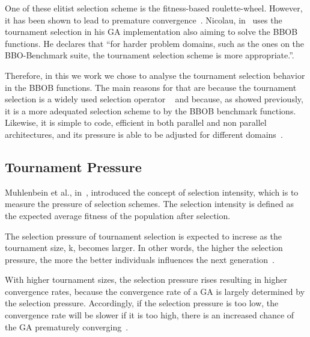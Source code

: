 One of these elitist selection scheme is the fitness-based roulette-wheel. However, it has been shown to lead to premature convergence~\cite{baker1987reducing}. Nicolau, in~\cite{nicolau2009application} uses the tournament selection in his GA implementation also aiming to solve the BBOB functions. He declares that ``for harder problem domains, such as the ones on the BBO-Benchmark suite, the tournament selection scheme is more appropriate.''.

Therefore, in this we work we chose to analyse the tournament selection behavior in the BBOB functions. The main reasons for that are because the tournament selection is a widely used selection operator ~\cite{goldberg1991real, goldberg1993toward, agrawal1995simulated, harik1999gambler, tsutsui1999multi, harik1999compact, deb2000efficient, beyer2001self,kaelo2007integrated, bhunia2009application,  nicolau2009application, sawyerr2011comparative, ecta14, sawyerr2015benchmarking} and because, as showed previously, it is a more adequated selection scheme to by the BBOB benchmark functions. Likewise, it is simple to code, efficient in both parallel and non parallel architectures, and its pressure is able to be adjusted for different domains~\cite{miller1995genetic}.



\subsection{Tournament Pressure}\label{sec:background:tournament_pressure} 
Muhlenbein et al., in~\cite{muhlenbein1993predictive}, introduced the concept of selection intensity, which is to measure the pressure of selection schemes. The selection intensity is defined as the expected average fitness of the population after selection. 

The selection pressure of tournament selection is expected to increse as the tournament size, k, becomes larger. In other words, the higher the selection pressure, the more the better individuals influences the next generation~\cite{miller1995genetic}.  

With higher tournament sizes, the selection pressure rises resulting in higher convergence rates, because the convergence rate of a GA is largely determined by the selection pressure.  Accordingly, if the selection pressure is too low, the convergence rate will be slower if it is too high, there is an increased chance of the GA prematurely converging~\cite{miller1995genetic}. 

